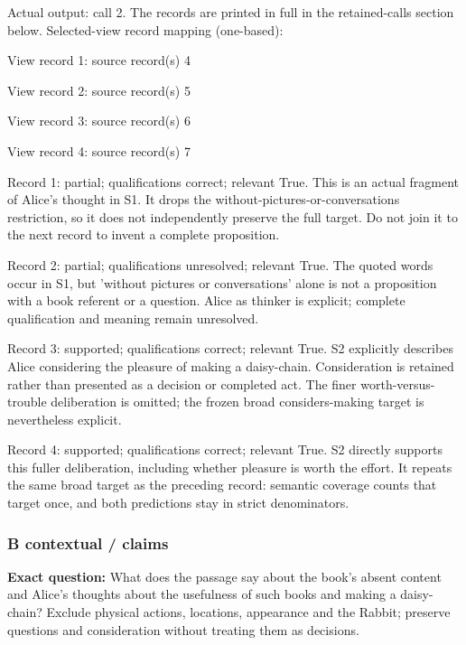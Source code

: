 Actual output: call 2. The records are printed in full in the retained-calls section below. Selected-view record mapping (one-based):

View record 1: source record(s) 4\par

View record 2: source record(s) 5\par

View record 3: source record(s) 6\par

View record 4: source record(s) 7\par

\noindent Record 1: partial; qualifications correct; relevant True. This is an actual fragment of Alice's thought in S1. It drops the without-pictures-or-conversations restriction, so it does not independently preserve the full target. Do not join it to the next record to invent a complete proposition.\par\smallskip

\noindent Record 2: partial; qualifications unresolved; relevant True. The quoted words occur in S1, but 'without pictures or conversations' alone is not a proposition with a book referent or a question. Alice as thinker is explicit; complete qualification and meaning remain unresolved.\par\smallskip

\noindent Record 3: supported; qualifications correct; relevant True. S2 explicitly describes Alice considering the pleasure of making a daisy-chain. Consideration is retained rather than presented as a decision or completed act. The finer worth-versus-trouble deliberation is omitted; the frozen broad considers-making target is nevertheless explicit.\par\smallskip

\noindent Record 4: supported; qualifications correct; relevant True. S2 directly supports this fuller deliberation, including whether pleasure is worth the effort. It repeats the same broad target as the preceding record: semantic coverage counts that target once, and both predictions stay in strict denominators.\par\smallskip

\subsubsection*{B contextual / claims}

\noindent\textbf{Exact question:} What does the passage say about the book's absent content and Alice's thoughts about the usefulness of such books and making a daisy-chain? Exclude physical actions, locations, appearance and the Rabbit; preserve questions and consideration without treating them as decisions.\par

